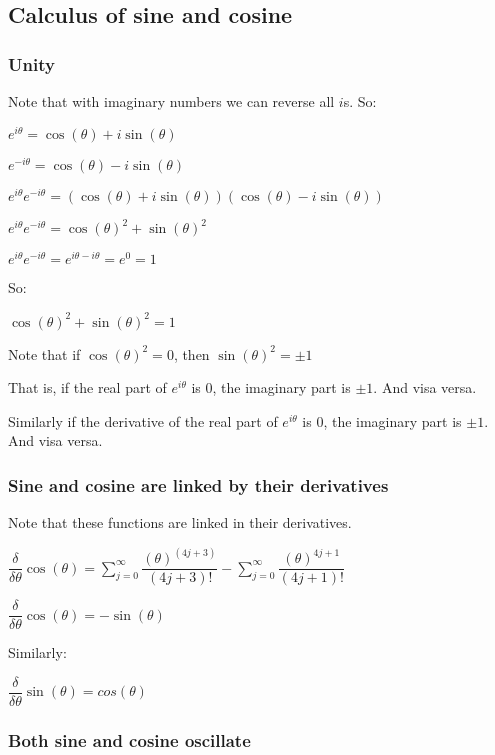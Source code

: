 
\subsection{Calculus of sine and cosine}

\subsubsection{Unity}

Note that with imaginary numbers we can reverse all \(i\)s. So:

\(e^{i\theta }=\cos (\theta )+i\sin (\theta )\)

\(e^{-i\theta }=\cos (\theta )-i\sin (\theta )\)

\(e^{i\theta }e^{-i\theta }=(\cos (\theta )+i\sin (\theta ))(\cos (\theta )-i\sin (\theta ))\)

\(e^{i\theta }e^{-i\theta }=\cos (\theta )^2+\sin (\theta )^2\)

\(e^{i\theta }e^{-i\theta }=e^{i\theta -i\theta }=e^0=1\)

So:

\(\cos (\theta )^2+\sin (\theta )^2=1\)

Note that if \(\cos (\theta )^2=0\), then \(\sin (\theta )^2=\pm 1\)

That is, if the real part of \(e^{i\theta }\) is \(0\), the imaginary part is \(\pm 1\). And visa versa.

Similarly if the derivative of the real part of \(e^{i\theta }\) is \(0\), the imaginary part is \(\pm 1\). And visa versa.

\subsubsection{Sine and cosine are linked by their derivatives}

Note that these functions are linked in their derivatives.

\(\dfrac{\delta }{\delta \theta }\cos (\theta )=\sum_{j=0}^\infty \dfrac{(\theta )^{(4j+3)}}{(4j+3)!}-\sum_{j=0}^\infty \dfrac{(\theta )^{4j+1}}{(4j+1)!}\)

\(\dfrac{\delta }{\delta \theta }\cos (\theta )=-\sin (\theta )\)

Similarly:

\(\dfrac{\delta }{\delta \theta }\sin (\theta )=cos(\theta )\)

\subsubsection{Both sine and cosine oscillate}

